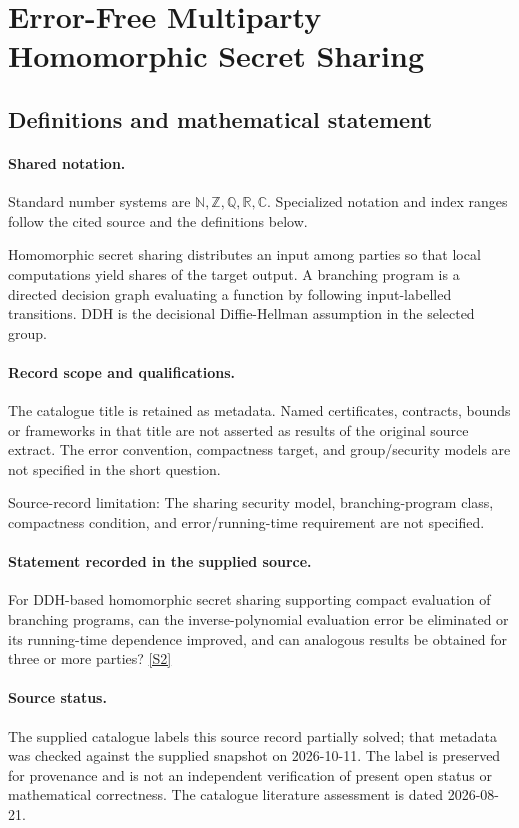 \documentclass[11pt]{article}
\newcommand{\sref}[2]{\hyperlink{source:#1:#2}{[S#2]}}
\begin{document}
\section{Error-Free Multiparty Homomorphic Secret Sharing}\label{statement}

\subsection{Definitions and mathematical statement}

\paragraph{Shared notation.}Standard number systems are $\mathbb N,\mathbb Z,\mathbb Q,\mathbb R,\mathbb C$. Specialized notation and index ranges follow the cited source and the definitions below.


Homomorphic secret sharing distributes an input among parties so that local computations yield shares of the target output. A branching program is a directed decision graph evaluating a function by following input-labelled transitions. DDH is the decisional Diffie-Hellman assumption in the selected group.
\paragraph{Record scope and qualifications.}
The catalogue title is retained as metadata. Named certificates, contracts, bounds or frameworks in that title are not asserted as results of the original source extract.
The error convention, compactness target, and group/security models are not specified in the short question.

Source-record limitation: The sharing security model, branching-program class, compactness condition, and error/running-time requirement are not specified.
\paragraph{Statement recorded in the supplied source.}
For DDH-based homomorphic secret sharing supporting compact evaluation of branching programs, can the inverse-polynomial evaluation error be eliminated or its running-time dependence improved, and can analogous results be obtained for three or more parties? \sref{statement}{2}
\paragraph{Source status.}
The supplied catalogue labels this source record partially solved; that metadata was checked against the supplied snapshot on 2026-10-11. The label is preserved for provenance and is not an independent verification of present open status or mathematical correctness. The catalogue literature assessment is dated 2026-08-21.
\end{document}

